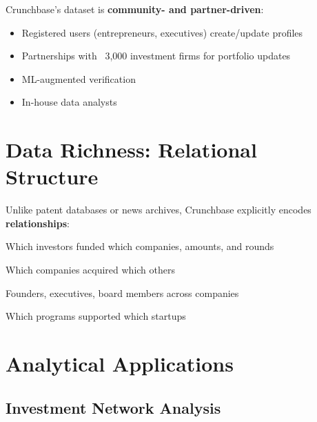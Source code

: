 \documentclass[../main.tex]{subfiles}
\begin{document}
Crunchbase's dataset is \textbf{community- and partner-driven}:
\begin{itemize}[leftmargin=*, itemsep=0.2em]
\item Registered users (entrepreneurs, executives) create/update profiles
\item Partnerships with ~3,000 investment firms for portfolio updates
\item ML-augmented verification
\item In-house data analysts
\end{itemize}


\section*{Data Richness: Relational Structure}

Unlike patent databases or news archives, Crunchbase explicitly encodes \textbf{relationships}:

\begin{description}[leftmargin=0.5cm, itemsep=0.3em]
\item[Funding Relationships] Which investors funded which companies, amounts, and rounds
\item[Acquisition Relationships] Which companies acquired which others
\item[People Relationships] Founders, executives, board members across companies
\item[Accelerator Relationships] Which programs supported which startups
\end{description}



\section*{Analytical Applications}

\subsection*{Investment Network Analysis}
\end{document}

